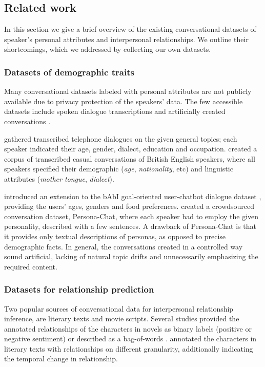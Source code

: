 \subsection{Related work}

In this section we give a brief overview of the existing conversational datasets of speaker's personal attributes and interpersonal relationships. We outline their shortcomings, which we addressed by collecting our own datasets.

\subsubsection{Datasets of demographic traits} 

Many conversational datasets labeled with personal attributes are not publicly available due to privacy protection of the speakers' data. The few accessible datasets include spoken dialogue transcriptions \cite{cieri2004fisher, love2017spoken} and artificially created conversations \cite{zhang2018personalizing, pers2}.

\citet{cieri2004fisher} gathered transcribed telephone dialogues on the given general topics; each speaker indicated their age, gender, dialect, education and occupation. \citet{love2017spoken} created a corpus of transcribed casual conversations of British English speakers, where all speakers specified their demographic (\textit{age}, \textit{nationality}, etc) and linguistic attributes (\textit{mother tongue}, \textit{dialect}). 

\citet{pers2} introduced an extension to the bAbI goal-oriented user-chatbot dialogue dataset \cite{bordes2016learning}, providing the users' ages, genders and food preferences. \citet{zhang2018personalizing} created a crowdsourced conversation dataset, Persona-Chat, where each speaker had to employ the given personality, described with a few sentences. A drawback of Persona-Chat is that it provides only textual descriptions of personas, as opposed to precise demographic facts. 
In general, the conversations created in a controlled way sound artificial, lacking of natural topic drifts and unnecessarily emphasizing the required content.  

\subsubsection{Datasets for relationship prediction} 

Two popular sources of conversational data for interpersonal relationship inference, are literary texts and movie scripts. Several studies provided the annotated relationships of the characters in novels as binary labels (positive or negative sentiment) \cite{chaturvedi2016modeling} or described as a bag-of-words \cite{iyyer2016feuding}. \citet{massey2015annotating} annotated the characters in literary texts with relationships on different granularity, additionally indicating the temporal change in relationship. 

